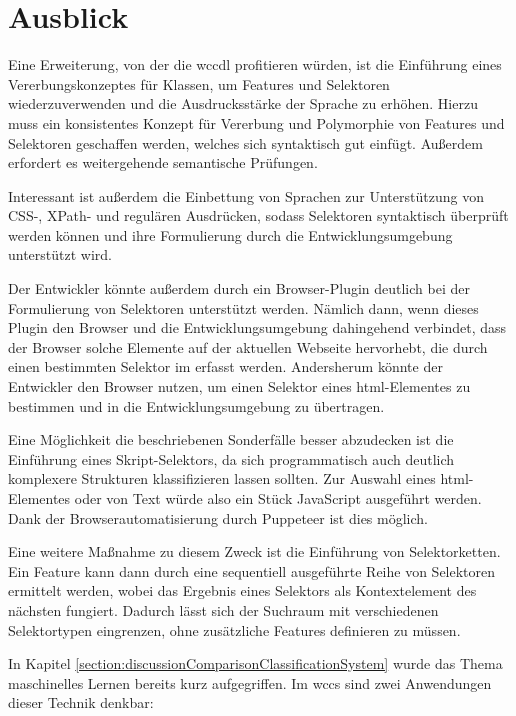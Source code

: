 \section{Ausblick}
    \label{section:endingOutlook}
    Eine Erweiterung, von der die \gls{wccdl} profitieren würden,
    ist die Einführung eines Vererbungskonzeptes für Klassen,
    um Features und Selektoren wiederzuverwenden und die Ausdrucksstärke
    der Sprache zu erhöhen.
    Hierzu muss ein konsistentes Konzept für Vererbung und Polymorphie
    von Features und Selektoren geschaffen werden,
    welches sich syntaktisch gut einfügt.
    Außerdem erfordert es weitergehende semantische Prüfungen.

    Interessant ist außerdem die Einbettung
    von Sprachen zur Unterstützung von CSS-, XPath- und regulären Ausdrücken,
    sodass Selektoren syntaktisch überprüft werden können
    und ihre Formulierung durch die Entwicklungsumgebung unterstützt wird.

    Der Entwickler könnte außerdem durch ein Browser-Plugin
    deutlich bei der Formulierung von Selektoren unterstützt werden.
    Nämlich dann, wenn dieses Plugin den Browser und die Entwicklungsumgebung
    dahingehend verbindet, dass der Browser solche Elemente auf der aktuellen Webseite
    hervorhebt, die durch einen bestimmten Selektor im {\classificationModel} erfasst werden.
    Andersherum könnte der Entwickler den Browser nutzen,
    um einen Selektor eines \gls{html}-Elementes zu bestimmen und
    in die Entwicklungsumgebung zu übertragen.

    Eine Möglichkeit die beschriebenen Sonderfälle besser abzudecken ist die
    Einführung eines Skript-Selektors,
    da sich programmatisch auch deutlich komplexere Strukturen klassifizieren lassen sollten.
    Zur Auswahl eines \gls{html}-Elementes oder von Text würde also ein Stück JavaScript ausgeführt werden.
    Dank der Browserautomatisierung durch Puppeteer ist dies möglich.

    Eine weitere Maßnahme zu diesem Zweck ist die Einführung von Selektorketten.
    Ein Feature kann dann durch eine sequentiell ausgeführte Reihe von Selektoren
    ermittelt werden, wobei das Ergebnis eines Selektors als Kontextelement des nächsten fungiert.
    Dadurch lässt sich der Suchraum mit verschiedenen Selektortypen eingrenzen,
    ohne zusätzliche Features definieren zu müssen.

    In Kapitel \ref{section:discussionComparisonClassificationSystem}
    wurde das Thema maschinelles Lernen bereits kurz aufgegriffen.
    Im \gls{wccs} sind zwei Anwendungen dieser Technik denkbar:

